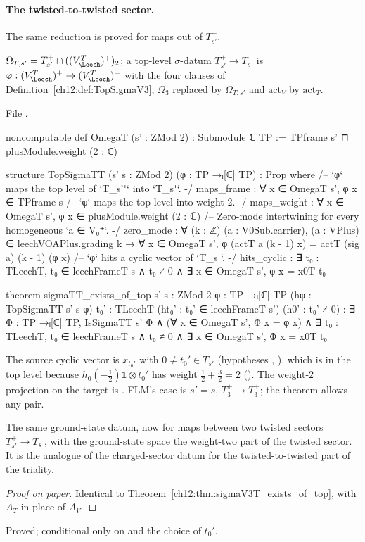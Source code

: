 \paragraph{The twisted-to-twisted sector.}  The same reduction is proved for maps out of $T_{s'}^+$.

\begin{definition}\label{ch12:def:TopSigmaTT}
$\Omega_{T,s'}=T_{s'}^+\cap((V_\Leech^T)^+)_2$; a top-level $\sigma$-datum $T_{s'}^+\to T_s^+$ is
$\varphi:(V_\Leech^T)^+\to(V_\Leech^T)^+$ with the four clauses of Definition~\ref{ch12:def:TopSigmaV3},
$\Omega_3$ replaced by $\Omega_{T,s'}$ and $\mathrm{act}_V$ by $\mathrm{act}_T$.
\end{definition}
File .
\begin{leancode}
noncomputable def OmegaT (s' : ZMod 2) : Submodule ℂ TP := TPframe s' ⊓ plusModule.weight (2 : ℂ)

structure TopSigmaTT (s' s : ZMod 2) (φ : TP →ₗ[ℂ] TP) : Prop where
  /-- `φ` maps the top level of `T_{s'}⁺` into `T_s⁺`. -/
  maps_frame : ∀ x ∈ OmegaT s', φ x ∈ TPframe s
  /-- `φ` maps the top level into weight 2. -/
  maps_weight : ∀ x ∈ OmegaT s', φ x ∈ plusModule.weight (2 : ℂ)
  /-- Zero-mode intertwining for every homogeneous `a ∈ V₀⁺`. -/
  zero_mode : ∀ (k : ℤ) (a : V0Sub.carrier), (a : VPlus) ∈ leechVOAPlus.grading k →
    ∀ x ∈ OmegaT s', φ (actT a (k - 1) x) = actT (sig a) (k - 1) (φ x)
  /-- `φ` hits a cyclic vector of `T_s⁺`. -/
  hits_cyclic : ∃ t₀ : TLeechT, t₀ ∈ leechFrameT s ∧ t₀ ≠ 0 ∧ ∃ x ∈ OmegaT s', φ x = x0T t₀

theorem sigmaTT_exists_of_top {s' s : ZMod 2} {φ : TP →ₗ[ℂ] TP} (hφ : TopSigmaTT s' s φ)
    {t₀' : TLeechT} (ht₀' : t₀' ∈ leechFrameT s') (h0' : t₀' ≠ 0) :
    ∃ Φ : TP →ₗ[ℂ] TP, IsSigmaTT s' Φ ∧ (∀ x ∈ OmegaT s', Φ x = φ x) ∧
      ∃ t₀ : TLeechT, t₀ ∈ leechFrameT s ∧ t₀ ≠ 0 ∧ ∃ x ∈ OmegaT s', Φ x = x0T t₀
\end{leancode}
\begin{dictionary}
The source cyclic vector is $x_{t_0'}$ with $0\neq t_0'\in T_{s'}$ (hypotheses ,
), which is in the top level because $h_0(-\tfrac12)\mathbf 1\otimes t_0'$ has weight
$\tfrac12+\tfrac32=2$ ().  The weight-$2$ projection on the target is
.  FLM's case is $s'=s$, $T_3^+\to T_3^+$; the theorem allows any pair.
\end{dictionary}

\begin{physics}
The same ground-state datum, now for maps between two twisted sectors $T_{s'}^+\to T_s^+$, with the ground-state space the weight-two part of the twisted sector. It is the analogue of the charged-sector datum for the twisted-to-twisted part of the triality.
\end{physics}
\begin{proof}[Proof on paper]
Identical to Theorem~\ref{ch12:thm:sigmaV3T_exists_of_top}, with $A_T$ in place of $A_V$.
\end{proof}
\begin{status}Proved; conditional only on  and the choice of $t_0'$.\end{status}

